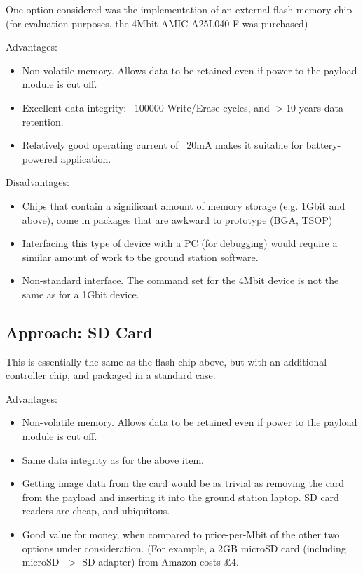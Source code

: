 One option considered was the implementation of an external flash memory chip 
(for evaluation purposes, the 4Mbit AMIC A25L040-F \cite{flash_datasheet} was purchased)

Advantages:
\begin{itemize}
\item Non-volatile memory. Allows data to be retained even if power to the payload module is cut off.
\item Excellent data integrity: ~100000 Write/Erase cycles, and $>$10 years data retention.
\item Relatively good operating current of ~20mA makes it suitable for battery-powered application.
\end{itemize}

Disadvantages:
\begin{itemize}
\item Chips that contain a significant amount of memory storage (e.g. 1Gbit 
and above), come in packages that are awkward to prototype (BGA, TSOP)
\item Interfacing this type of device with a PC (for debugging) would require a similar amount 
of work to the ground station software.
\item Non-standard interface. The command set for the 4Mbit device is not the 
same as for a 1Gbit device.
\end{itemize}



\subsection{Approach: SD Card}

This is essentially the same as the flash chip above, but with an additional controller chip, and packaged in a standard case.

Advantages:
\begin{itemize}
\item Non-volatile memory. Allows data to be retained even if power to the payload module is cut off.
\item Same data integrity as for the above item.
\item Getting image data from the card would be as trivial as removing the 
card from the payload and inserting it into the ground station laptop. SD card 
readers are cheap, and ubiquitous.
\item Good value for money, when compared to price-per-Mbit of the other two 
options under consideration. (For example, a 2GB microSD card (including 
microSD -$>$ SD adapter) from Amazon costs \pounds4.
\end{itemize}

